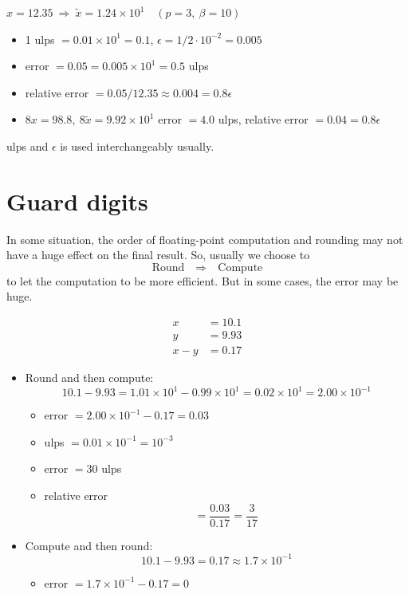 \begin{eg}
    $x = 12.35 \ \Rightarrow \ \tilde{x} = 1.24 \times 10^{1} \quad (p=3,\ \beta=10)$
\end{eg}

\begin{itemize}
    \item 1 ulps $= 0.01 \times 10^1 = 0.1$, $\epsilon = 1/2\cdot 10^{-2} = 0.005$
    \item error $= 0.05 = 0.005 \times 10^{1} = 0.5 $ ulps
    \item relative error $= 0.05/12.35 \approx 0.004 = 0.8\epsilon$
    \item $8x = 98.8, \ 8 \tilde{x} = 9.92 \times 10^1$ error $= 4.0$ ulps, relative error $= 0.04 = 0.8\epsilon$
\end{itemize}

\begin{note}
    ulps and $\epsilon$ is used interchangeably usually.
\end{note}

\section{Guard digits}

In some situation, the order of floating-point computation and rounding may not have a huge effect on the final result. So, usually we choose to \[
    \boxed{\text{Round}} \quad \Rightarrow \quad \boxed{\text{Compute}}
\]
to let the computation to be more efficient. But in some cases, the error may be huge.

\begin{eg}
    \begin{align*}
        x &= 10.1 \\
        y &= 9.93 \\
        x - y &= 0.17
    \end{align*}
\end{eg}
\begin{itemize}
    \item Round and then compute:
    \[
        10.1 - 9.93 = 1.01 \times 10^1 - 0.99 \times 10^1 = 0.02 \times 10^1 = 2.00 \times 10^{-1}
    \]
    \begin{itemize}
        \item error $= 2.00 \times 10^{-1} - 0.17 = 0.03$
        \item ulps $= 0.01 \times 10^{-1} = 10^{-3}$
        \item error $= 30$ ulps
        \item relative error \[
            = \frac{0.03}{0.17} = \frac{3}{17}
        \]
    \end{itemize}
    \item Compute and then round:
    \[
        10.1 - 9.93 = 0.17 \approx 1.7 \times 10^{-1}
    \]
    \begin{itemize}
        \item error $= 1.7 \times 10^{-1} - 0.17 = 0$
    \end{itemize}
\end{itemize}

